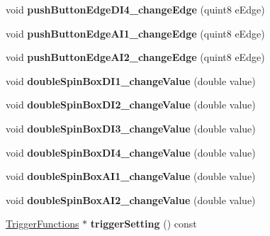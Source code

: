 \begin{DoxyCompactItemize}
void {\bfseries push\+Button\+Edge\+D\+I4\+\_\+change\+Edge} (quint8 e\+Edge)
\item 
\mbox{\label{class_setting_trigger_setting_a0cff06d1ef03d6e57e0621e68f2ba0e0}} 
void {\bfseries push\+Button\+Edge\+A\+I1\+\_\+change\+Edge} (quint8 e\+Edge)
\item 
\mbox{\label{class_setting_trigger_setting_a407ff0b8d26641d280b66458e7283598}} 
void {\bfseries push\+Button\+Edge\+A\+I2\+\_\+change\+Edge} (quint8 e\+Edge)
\item 
\mbox{\label{class_setting_trigger_setting_a95004c2ac4d43958d032918d774e92ba}} 
void {\bfseries double\+Spin\+Box\+D\+I1\+\_\+change\+Value} (double value)
\item 
\mbox{\label{class_setting_trigger_setting_a78505eb514d045304771e31fbb05f3a8}} 
void {\bfseries double\+Spin\+Box\+D\+I2\+\_\+change\+Value} (double value)
\item 
\mbox{\label{class_setting_trigger_setting_a2720ede29a22459fe262e8c9042023a8}} 
void {\bfseries double\+Spin\+Box\+D\+I3\+\_\+change\+Value} (double value)
\item 
\mbox{\label{class_setting_trigger_setting_ae0364ec7f563b81745220ab5f874f8dd}} 
void {\bfseries double\+Spin\+Box\+D\+I4\+\_\+change\+Value} (double value)
\item 
\mbox{\label{class_setting_trigger_setting_aef9a1d1de95fba39e1d9d8787fdda837}} 
void {\bfseries double\+Spin\+Box\+A\+I1\+\_\+change\+Value} (double value)
\item 
\mbox{\label{class_setting_trigger_setting_a7d66206534654fb465ad88951b050427}} 
void {\bfseries double\+Spin\+Box\+A\+I2\+\_\+change\+Value} (double value)
\item 
\mbox{\label{class_setting_trigger_setting_aa48f974ed0fa2f963c7204cadf459d72}} 
\hyperlink{class_trigger_functions}{Trigger\+Functions} $\ast$ {\bfseries trigger\+Setting} () const

\end{DoxyCompactItemize}
